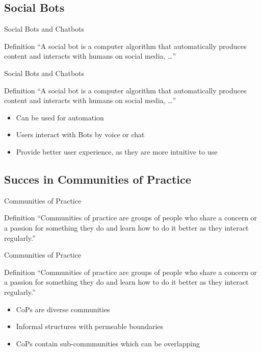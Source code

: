 \subsection{Social Bots}
\begin{frame}{Social Bots and Chatbots}
  \begin{block}{Definition}
    ``A social bot is a computer algorithm that automatically produces content and interacts with humans on social media, \dots'' \cite{FVD*16b}
  \end{block}
\end{frame}
\begin{frame}{Social Bots and Chatbots}
  \begin{block}{Definition}
    ``A social bot is a computer algorithm that automatically produces content and interacts with humans on social media, \dots'' \cite{FVD*16b}
  \end{block}
  \begin{itemize}
    \item Can be used for automation  %
    \item Users interact with Bots by voice or chat %
    \item Provide better user experience, as they are more intuitive to use
  \end{itemize}
\end{frame}

\subsection{Succes in Communities of Practice}
\begin{frame}{Communities of Practice}
  \begin{block}{Definition}
    ``Communities of practice are groups of people who share a concern or a
    passion for something they do and learn how to do it better as they interact regularly.'' \cite{Weng98}
  \end{block}
\end{frame}

\begin{frame}{Communities of Practice}
  \begin{block}{Definition}
    ``Communities of practice are groups of people who share a concern or a
    passion for something they do and learn how to do it better as they interact regularly.'' \cite{Weng98}
  \end{block}
  \begin{itemize}
    \item CoPs are  diverse communities
    \item Informal structures with permeable boundaries \cite{RKJa15}
    \item CoPs contain sub-commmunities which can be overlapping
  \end{itemize}
\end{frame}


